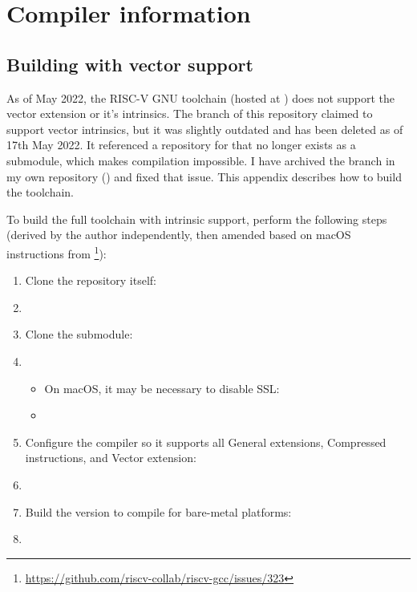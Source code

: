 \chapter{Compiler information}

\section{Building  with vector support}\label{appx:building_rvv_gcc_toolchain}

As of May 2022, the RISC-V GNU toolchain (hosted at ) does not support the vector extension or it's intrinsics.
The  branch of this repository claimed to support vector intrinsics, but it was slightly outdated and has been deleted as of 17th May 2022.
It referenced a repository for  that no longer exists as a submodule, which makes compilation impossible.
I have archived the branch in my own repository () and fixed that issue.
This appendix describes how to build the toolchain.

To build the full toolchain with intrinsic support, perform the following steps (derived by the author independently, then amended based on macOS instructions from \footnote{\url{https://github.com/riscv-collab/riscv-gcc/issues/323}}):
\begin{enumerate}
    \item Clone the repository itself:
    \item[\code{\$}] 
    \item Clone the  submodule:
    \item[\code{\$}] 
    \begin{itemize}
        \item On macOS, it may be necessary to disable SSL:
        \item[\code{\$}] 
    \end{itemize}
    \item Configure the compiler so it supports all General extensions, Compressed instructions, and Vector extension:
    \item[\code{\$}] 
    \item Build the  version to compile for bare-metal platforms:
    \item[\code{\$}] 
\end{enumerate}

